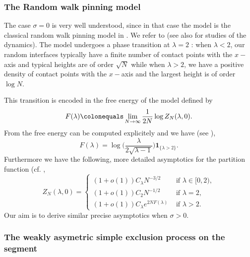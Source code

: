 \documentclass[reqno,11pt]{amsart}
\numberwithin{equation}{section}
\newcommand{\gl}{\lambda}
\newcommand{\ind}{\mathbf{1}}
\begin{document}
\subsubsection{The Random walk pinning model}
The case $\sigma=0$ is very well understood, since in that case the model is the classical random walk pinning model in \cite{fisher1984walks}. We refer to   \cite{GiacominPolymerbk} (see also \cite{caputo2008approach, yang2019cutoff}  for studies of the dynamics). 
The model undergoes a phase transition at $\gl=2$  :  when $\gl<2$,  our random interfaces typically have a finite number of contact points with the $x-$axis and typical heights are of order $\sqrt{N}$ while when $\lambda>2$, we have a positive density of contact points with the $x-$axis and the largest height is of order $\log N$.

\medskip

\noindent This transition is encoded in the free energy of the model defined by
\begin{equation*}
F(\lambda) \colonequals \lim_{N \to \infty} \frac{1}{2N} \log Z_N(\lambda, 0).
\end{equation*}
 From \cite[Proposition 1.1]{GiacominPolymerbk} the free energy can be computed explicitely  and we have (see \cite[Equation (1.5)]{lacoin2015mathematical}),
\begin{equation}
F(\lambda)=\log \bigg(\frac{\lambda}{2\sqrt{\lambda-1}}\bigg) \ind_{\{\lambda>2\}}. \label{functionf}
\end{equation}
Furthermore  we have the following, more detailed asymptotics for the partition function (cf. \cite[Theorem 2.2]{GiacominPolymerbk}, 
\begin{equation}\label{asymppinning}
  Z_N(\lambda, 0)=\begin{cases} (1+o(1)) C_{\gl} N^{-3/2} \quad & \text{ if } \gl\in [0,2),\\
                   (1+o(1))C_{2} N^{-1/2} & \text{ if } \gl=2,\\
                   (1+o(1))C_{\gl} e^{2N F(\gl)} & \text{ if } \gl>2.
                   \end{cases}
\end{equation}
Our aim is to derive similar precise asymptotics when $\sigma>0$.

\subsubsection{The weakly asymetric simple exclusion process on the segment}
\end{document}
